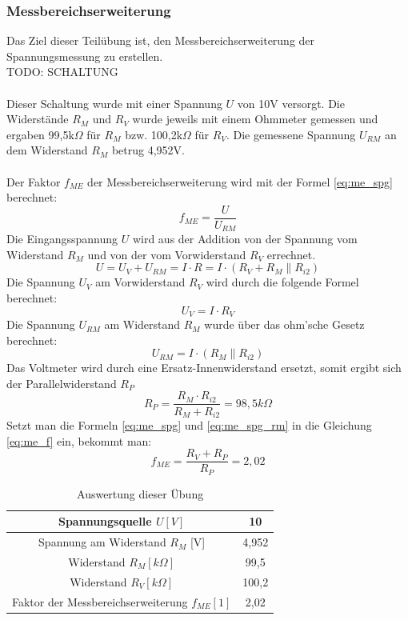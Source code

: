 \subsubsection{Messbereichserweiterung}
Das Ziel dieser Teilübung ist, den Messbereichserweiterung der Spannungsmessung zu erstellen.
~\\
TODO: SCHALTUNG		\\
~\\
Dieser Schaltung wurde mit einer Spannung $U$ von 10V versorgt. Die Widerstände $R_M$ und $R_V$ wurde jeweils mit einem Ohmmeter gemessen und ergaben 99,5k$\Omega$ für $R_M$ bzw. 100,2k$\Omega$ für $R_V$. Die gemessene Spannung $U_{RM}$ an dem Widerstand $R_M$ betrug 4,952V.	\\
~\\
Der Faktor $f_{ME}$ der Messbereichserweiterung wird mit der Formel \ref{eq:me_spg} berechnet:
\begin{equation}
	f_{ME} = \dfrac{U}{U_{RM}}
	\label{eq:me_f}
\end{equation}
Die Eingangsspannung $U$ wird aus der Addition von der Spannung vom Widerstand $R_M$ und von der vom Vorwiderstand $R_V$ errechnet.
\begin{equation}
	U = U_V + U_{RM} = I \cdot R = I \cdot (R_V + R_M \parallel R_{i2})
	\label{eq:me_spg}
\end{equation}
Die Spannung $U_V$ am Vorwiderstand $R_V$ wird durch die folgende Formel berechnet:
\begin{equation}
	U_V = I \cdot R_V
\end{equation}
Die Spannung $U_{RM}$ am Widerstand $R_M$ wurde über das ohm'sche Gesetz berechnet:
\begin{equation}
	U_{RM} = I \cdot (R_M \parallel R_{i2})
	\label{eq:me_spg_rm}
\end{equation}
Das Voltmeter wird durch eine Ersatz-Innenwiderstand ersetzt, somit ergibt sich der Parallelwiderstand $R_P$
\begin{equation}
	R_P = \dfrac{R_M \cdot R_{i2}}{R_M + R_{i2}} = 98,5k\Omega
\end{equation}
Setzt man die Formeln \ref{eq:me_spg} und \ref{eq:me_spg_rm} in die Gleichung \ref{eq:me_f} ein, bekommt man:
\begin{equation}
	f_{ME} = \dfrac{R_V + R_P}{R_P} = 2,02
\end{equation}
\begin{table}[h]
	\centering
	\begin{tabular}{|c|c|}
	\hline 
	Spannungsquelle $U [V]$					& 10 		\\ 
	\hline 
	Spannung am Widerstand $R_M$ [V] 			& 4,952	\\ 
	\hline 
	Widerstand $R_M [k\Omega]$ 				& 99,5	\\ 
	\hline 
	Widerstand $R_V [k\Omega]$ 				& 100,2	\\ 
	\hline 
	Faktor der Messbereichserweiterung $f_{ME} [1]$	& 2,02	\\ 
	\hline 
	\end{tabular}
	\caption{Auswertung dieser Übung}
\end{table}

